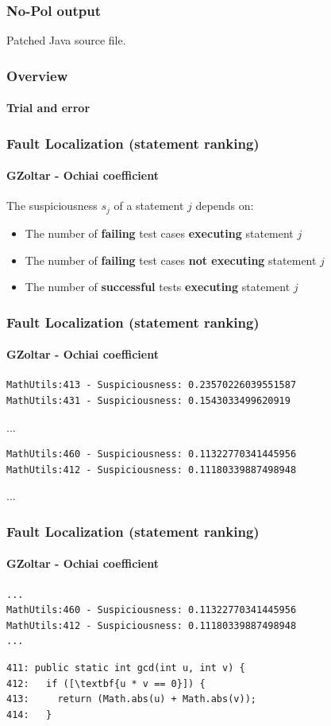 \documentclass{beamer}
\begin{document}
\begin{frame}
\frametitle{No-Pol output}
Patched Java source file.
\end{frame}


\frame
{
    \frametitle{Overview}
    \framesubtitle{Trial and error}
  \begin{center}
  
  \end{center}
}


\begin{frame}[fragile]
    \frametitle{Fault Localization (statement ranking)}
      \framesubtitle{GZoltar - Ochiai coefficient}
The suspiciousness $s_j$ of a statement $j$ depends on:
\begin{itemize}
 \item The number of \textbf{failing} test cases \textbf{executing} statement $j$ 
 \item The number of \textbf{failing} test cases \textbf{not executing} statement $j$
 \item The number of \textbf{successful} tests \textbf{executing} statement $j$
\end{itemize}
\end{frame}


\begin{frame}[fragile]
\frametitle{Fault Localization (statement ranking)}
\framesubtitle{GZoltar - Ochiai coefficient}
\begin{verbatim}
MathUtils:413 - Suspiciousness: 0.23570226039551587
MathUtils:431 - Suspiciousness: 0.1543033499620919
\end{verbatim}
...
\begin{verbatim}
MathUtils:460 - Suspiciousness: 0.11322770341445956
MathUtils:412 - Suspiciousness: 0.11180339887498948
\end{verbatim}
...
\end{frame}


\begin{frame}[fragile]
\frametitle{Fault Localization (statement ranking)}
\framesubtitle{GZoltar - Ochiai coefficient}
\begin{verbatim}
...
MathUtils:460 - Suspiciousness: 0.11322770341445956
MathUtils:412 - Suspiciousness: 0.11180339887498948
...
\end{verbatim}

\begin{lstlisting}[escapeinside=\[\]]
411: public static int gcd(int u, int v) {
412:   if ([\textbf{u * v == 0}]) {
413:     return (Math.abs(u) + Math.abs(v));
414:   }
\end{lstlisting}
\end{frame}
\end{document}
